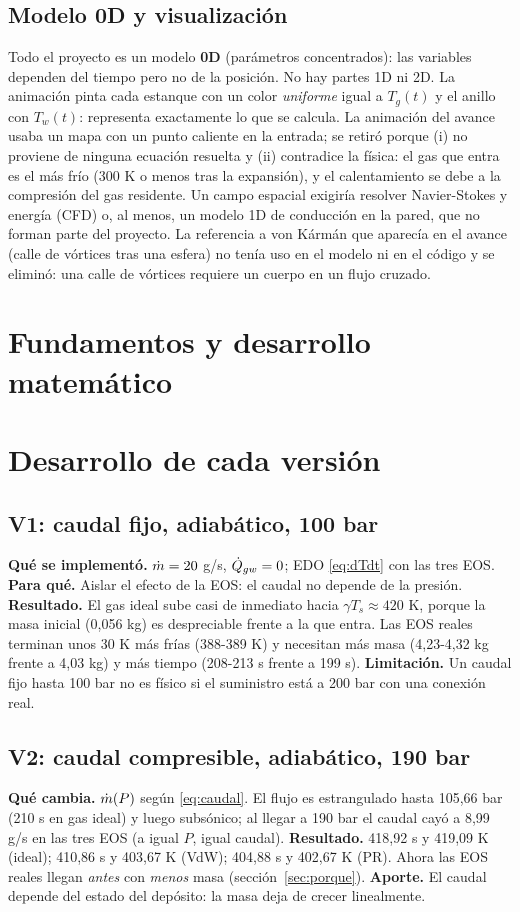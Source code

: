 \documentclass[11pt]{article}
\begin{document}
\subsection{Modelo 0D y visualización}
Todo el proyecto es un modelo \textbf{0D} (parámetros concentrados): las variables dependen del tiempo pero no
de la posición. No hay partes 1D ni 2D. La animación pinta cada estanque con un color \emph{uniforme} igual a
$T_g(t)$ y el anillo con $T_w(t)$: representa exactamente lo que se calcula. La animación del avance usaba un
mapa con un punto caliente en la entrada; se retiró porque (i) no proviene de ninguna ecuación resuelta y
(ii) contradice la física: el gas que entra es el más frío (300 K o menos tras la expansión), y el
calentamiento se debe a la compresión del gas residente. Un campo espacial exigiría resolver Navier-Stokes y
energía (CFD) o, al menos, un modelo 1D de conducción en la pared, que no forman parte del proyecto.
La referencia a von Kármán que aparecía en el avance (calle de vórtices tras una esfera) no tenía uso en el
modelo ni en el código y se eliminó: una calle de vórtices requiere un cuerpo en un flujo cruzado.

\section{Fundamentos y desarrollo matemático}


\section{Desarrollo de cada versión}
\subsection{V1: caudal fijo, adiabático, 100 bar}
\textbf{Qué se implementó.} $\dot m=20$ g/s, $\dot Q_{gw}=0$; EDO \eqref{eq:dTdt} con las tres EOS.
\textbf{Para qué.} Aislar el efecto de la EOS: el caudal no depende de la presión.
\textbf{Resultado.} El gas ideal sube casi de inmediato hacia $\gamma T_s\approx420$ K, porque la masa inicial
(0,056 kg) es despreciable frente a la que entra. Las EOS reales terminan unos 30 K más frías (388-389 K) y
necesitan más masa (4,23-4,32 kg frente a 4,03 kg) y más tiempo (208-213 s frente a 199 s).
\textbf{Limitación.} Un caudal fijo hasta 100 bar no es físico si el suministro está a 200 bar con una conexión real.

\subsection{V2: caudal compresible, adiabático, 190 bar}
\textbf{Qué cambia.} $\dot m(P)$ según \eqref{eq:caudal}. El flujo es estrangulado hasta 105,66 bar (210 s en gas
ideal) y luego subsónico; al llegar a 190 bar el caudal cayó a 8,99 g/s en las tres EOS (a igual $P$, igual caudal).
\textbf{Resultado.} 418,92 s y 419,09 K (ideal); 410,86 s y 403,67 K (VdW); 404,88 s y 402,67 K (PR).
Ahora las EOS reales llegan \emph{antes} con \emph{menos} masa (sección~\ref{sec:porque}).
\textbf{Aporte.} El caudal depende del estado del depósito: la masa deja de crecer linealmente.
\end{document}
